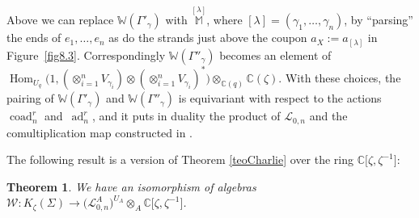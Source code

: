 \documentclass[pdftex]{sigma}%
\numberwithin{equation}{section}
\numberwithin{figure}{section}
\newtheorem{teo}{Theorem}[section]
\newcommand{\mc}{\mathbb{C}}
\newcommand{\Ll}{{\mathcal L}}
\newcommand{\ra}{\rightarrow}
\begin{document}
\begin{remk}{\rm Above we can replace $\mathbb{W}(\Gamma'_\gamma)$ with $\stackrel{[\lambda]}{\mathbb{M}}$, where $[\lambda] = (\gamma_1,\dots,\gamma_n)$, by ``parsing'' the ends of $e_1,\dots,e_n$ as do the strands just above the coupon $a_X:=a_{[\lambda]}$ in Figure~\ref{fig8.3}. Cor\-res\-pon\-dingly $\mathbb{W}(\Gamma''_\gamma)$ becomes an element of $\operatorname{Hom}_{U_q}\big(1, (\otimes_{i=1}^n V_{\gamma_i})\otimes (\otimes_{i=1}^n V_{\gamma_i})^*\big) \otimes_{\mc(q)} \mc(\zeta)$. With these choices, the pairing of $\mathbb{W}(\Gamma'_\gamma)$ and $\mathbb{W}(\Gamma''_\gamma)$ is equivariant with respect to the actions $\operatorname{coad}^r_n$ and~$\operatorname{ad}^r_n$, and it puts in duality the product of $\Ll_{0,n}$ and the comultiplication map constructed in \cite{BFK}.}
\end{remk}

The following result is a version of Theorem \ref{teoCharlie} over the ring $\mc\big[\zeta,\zeta^{-1}\big]$:
\begin{teo}\label{teoOBS} We have an isomorphism of algebras $\mathcal{W}\colon K_\zeta(\Sigma)\ra \big(\Ll_{0,n}^A\big)^{U_A}\otimes_A \mc\big[\zeta,\zeta^{-1}\big]$.
\end{teo}
\end{document}
